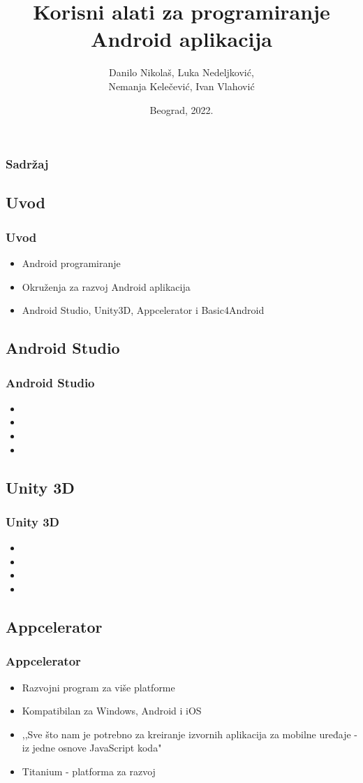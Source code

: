 \documentclass{beamer}
\title{Korisni alati za programiranje Android aplikacija}
\author{Danilo Nikolaš, Luka Nedeljković,\\ Nemanja Kelečević, Ivan Vlahović}
\institute[]{Matematički fakultet, Univerzitet u Beogradu}
\date{
	\footnotesize{Beograd, 2022.}	
}
\begin{document}
\begin{frame}
	\titlepage
\end{frame}


\begin{frame}
	\frametitle{Sadržaj}
	\tableofcontents[hidesubsections] 
\end{frame}

\begin{frame}
    \section{Uvod}
    \frametitle{Uvod} 
    \begin{itemize}
	\item Android programiranje
	\item Okruženja za razvoj Android aplikacija
	\item Android Studio, Unity3D, Appcelerator i Basic4Android
   \end{itemize}
\end{frame}

\begin{frame}
    \section{Android Studio}
    \frametitle{Android Studio} 
    \begin{itemize}
	\item
	\item 
	\item 
	\item  
   \end{itemize}
\end{frame}

\begin{frame}
    \section{Unity 3D}
    \frametitle{Unity 3D} 
    \begin{itemize}
	\item
	\item 
	\item 
	\item  
   \end{itemize}
\end{frame}

\begin{frame}
    \section{Appcelerator}
    \frametitle{Appcelerator} 
    \begin{itemize}
    	\item Razvojni program za više platforme
	\item Kompatibilan za Windows, Android i iOS
	\item ,,Sve što nam je potrebno za kreiranje izvornih aplikacija za mobilne uređaje - iz jedne osnove JavaScript koda"
	\item  Titanium - platforma za razvoj
   \end{itemize}
\end{frame}
\end{document}
